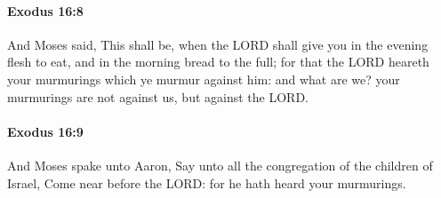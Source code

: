 		\paragraph{Exodus 16:8} %
			\label{EXODUS-16-8}

			And Moses said, This shall be, when the LORD shall give you in the evening flesh to eat, and in the morning bread to the full; for that the LORD heareth your murmurings which ye murmur against him: and what are we? your murmurings are not against us, but against the LORD.


		\paragraph{Exodus 16:9} %
			\label{EXODUS-16-9}

			And Moses spake unto Aaron, Say unto all the congregation of the children of Israel, Come near before the LORD: for he hath heard your murmurings.


